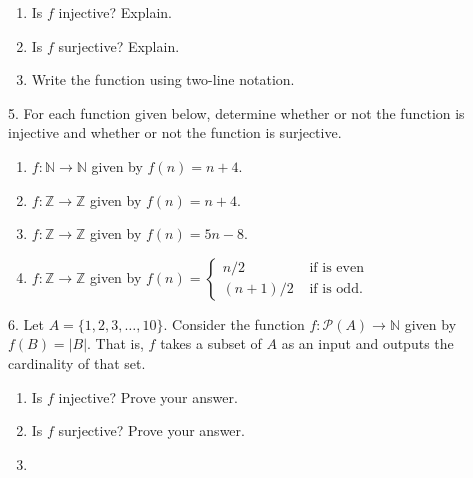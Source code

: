 \documentclass[10pt,]{book}
\theoremstyle{plain}
\theoremstyle{definition}
\theoremstyle{definition}
\theoremstyle{definition}
\numberwithin{equation}{section}
\def\N{\mathbb N}
\def\Z{\mathbb Z}
\def\pow{\mathcal P}
\newcommand{\amp}{ & }
\begin{document}
\begin{exerciselist}
\begin{figure}
{
}
\end{figure}
\leavevmode%
\begin{enumerate}[label=(\alph*)]
\item\hypertarget{li-307}{}
                Is \(f\) injective? Explain.
\item\hypertarget{li-308}{}
                Is \(f\) surjective? Explain.
\item\hypertarget{li-309}{}
                Write the function using two-line notation.
\end{enumerate}
\par\smallskip
\item[5.]\hypertarget{exercise-31}{}
            For each function given below, determine whether or not the function is injective and whether or not the function is surjective.
\leavevmode%
\begin{enumerate}[label=(\alph*)]
\item\hypertarget{li-313}{}\(f:\N \to \N\) given by \(f(n) = n+4\).%
\item\hypertarget{li-314}{}\(f:\Z \to \Z\) given by \(f(n) = n+4\).%
\item\hypertarget{li-315}{}\(f:\Z \to \Z\) given by \(f(n) = 5n - 8\).%
\item\hypertarget{li-316}{}\(f:\Z \to \Z\) given by \(f(n) = \begin{cases}n/2 \amp  \mbox{ if  is even} \\ (n+1)/2 \amp \mbox{ if  is odd} . \end{cases}
              \)%
\end{enumerate}
\par\smallskip
\item[6.]\hypertarget{exercise-32}{}
            Let \(A = \{1,2,3,\ldots,10\}\). Consider the function \(f:\pow(A) \to \N\) given by \(f(B) = |B|\). That is, \(f\) takes a subset of \(A\) as an input and outputs the cardinality of that set.
\leavevmode%
\begin{enumerate}[label=(\alph*)]
\item\hypertarget{li-321}{}
                Is \(f\) injective? Prove your answer.
\item\hypertarget{li-322}{}
                Is \(f\) surjective? Prove your answer.
\item\hypertarget{li-323}{}

\end{enumerate}
\end{exerciselist}
\end{document}

